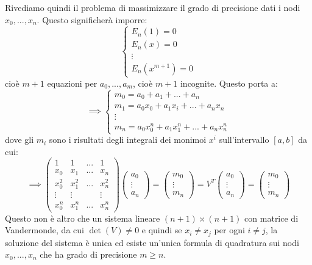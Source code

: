 \documentclass[a4paper,11pt]{article}
\begin{document}
Rivediamo quindi il problema di massimizzare il grado di precisione dati i nodi $x_0, ..., x_n$.
Questo significherà imporre:
\[
	\begin{cases}
		E_n(1) = 0 \\
		E_n(x) = 0 \\
		\vdots \\
		E_n(x^{m + 1}) = 0
	\end{cases}
\]
cioè $m +1$ equazioni per $a_0, ..., a_m$, cioè $m + 1$ incognite.
Questo porta a:
\[
	\implies
	\begin{cases}
		m_0 = a_0 + a_1 + ... + a_n \\
		m_1 = a_0 x_0 + a_1 x_i + ... + a_n x_n \\
		\vdots \\
		m_n = a_0 x_0^n + a_1 x_1^n + ... + a_n x_n^n
	\end{cases}
\]
dove gli $m_i$ sono i risultati degli integrali dei monimoi $x^i$ sull'intervallo $[a, b]$ da cui:
$$
\implies
\begin{pmatrix}
	1 & 1 & ... & 1 \\
	x_0 & x_1 & ... & x_n \\
	x_0^2 & x_1^2 & ... & x_n^2 \\
	\vdots & \vdots & & \vdots \\
	x_0^n & x_1^n & ... & x_n^n
\end{pmatrix}
\begin{pmatrix}
	a_0 \\ \vdots \\ a_n
\end{pmatrix}
=
\begin{pmatrix}
	m_0 \\ \vdots \\ m_n
\end{pmatrix}
=
V^T
\begin{pmatrix}
	a_0 \\ \vdots \\ a_n
\end{pmatrix}
=
\begin{pmatrix}
	m_0 \\ \vdots \\ m_n
\end{pmatrix}
$$
Questo non è altro che un sistema lineare $(n + 1) \times (n + 1)$ con matrice di Vandermonde, da cui $\det(V) \neq 0$ e quindi se $x_i \neq x_j$ per ogni $i \neq j$, la soluzione del sistema è unica ed esiste un'unica formula di quadratura sui nodi $x_0, ..., x_n$ che ha grado di precisione $m \geq n$.
\end{document}
